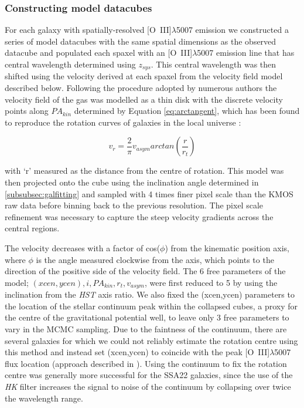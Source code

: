 \documentclass[fleqn,usenatbib]{mnras}
\begin{document}
\subsubsection{Constructing model datacubes}\label{subsubec:model_cube}
For each galaxy with spatially-resolved [O~{\sc III}]$\lambda$5007 emission we constructed a series of model datacubes with the same spatial dimensions as the observed datacube and populated each spaxel with an [O~{\sc III}]$\lambda$5007 emission line that has central wavelength determined using $z_{sys}$.
This central wavelength was then shifted using the velocity derived at each spaxel from the velocity field model described below.  
Following the procedure adopted by numerous authors \citep[e.g.][]{Epinat2010,Epinat2012,Swinbank2012,Stott2016,Mason2017} the velocity field of the gas was modelled as a thin disk with the discrete velocity points along $PA_{kin}$ determined by Equation \ref{eq:arctangent}, which has been found to reproduce the rotation curves of galaxies in the local universe \citep[e.g.][]{Courteau1997}:

\begin{equation}\label{eq:arctangent}
   v_{r} = \frac{2}{\pi}v_{asym}arctan\left(\frac{r}{r_{t}}\right)
\end{equation}

\noindent
with `r' measured as the distance from the centre of rotation.
This model was then projected onto the cube using the inclination angle determined in \cref{subsubsec:galfitting} and sampled with 4 times finer pixel scale than the KMOS raw data before binning back to the previous resolution.
The pixel scale refinement was necessary to capture the steep velocity gradients across the central regions.

\noindent
The velocity decreases with a factor of cos($\phi$) from the kinematic position axis, where $\phi$ is the angle measured clockwise from the axis, which points to the direction of the positive side of the velocity field.
The 6 free parameters of the model; $(xcen, ycen), i, PA_{kin}, r_{t}, v_{asym}$, were first reduced to 5 by using the inclination from the {\em HST} axis ratio.
We also fixed the (xcen,ycen) parameters to the location of the stellar continuum peak within the collapsed cubes, a proxy for the centre of the gravitational potential well, to leave only 3 free parameters to vary in the MCMC sampling.
Due to the faintness of the continuum, there are several galaxies for which we could not reliably estimate the rotation centre using this method and instead set (xcen,ycen) to coincide with the peak [O~{\sc III}]$\lambda$5007 flux location (approach described in \citealt{Harrison2017}).
Using the continuum to fix the rotation centre was generally more successful for the SSA22 galaxies, since the use of the {\it HK} filter increases the signal to noise of the continuum by collapsing over twice the wavelength range. \\
\end{document}
